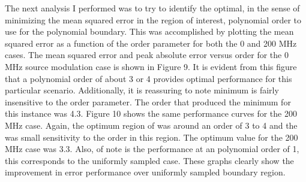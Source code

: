 \documentclass [11 pt, titlepage]{article}
\begin{document}
The next analysis I performed was to try to identify the optimal, in
the sense of minimizing the mean squared error in the region of interest,
polynomial order to use for the polynomial boundary.  This was
accomplished by plotting the mean squared error as a function of the
order parameter for both the 0 and 200 MHz cases.  The mean squared
error and peak absolute error versus order for the 0 MHz source
modulation case is shown in Figure 9.  It is evident from this figure
that a polynomial order of about 3 or 4 provides optimal performance
for this particular scenario.  Additionally, it is reassuring to note
minimum is fairly insensitive to the order parameter.  The order that
produced the minimum for this instance was 4.3.  Figure 10 shows the
same performance curves for the 200 MHz case.  Again, the optimum
region of was around an order of 3 to 4 and the was small sensitivity
to the order in this region.  The optimum value for the 200 MHz case
was 3.3.  Also, of note is the performance at an polynomial order of
1, this corresponds to the uniformly sampled case.  These graphs
clearly show the improvement in error performance over uniformly
sampled boundary region.
\end{document}
